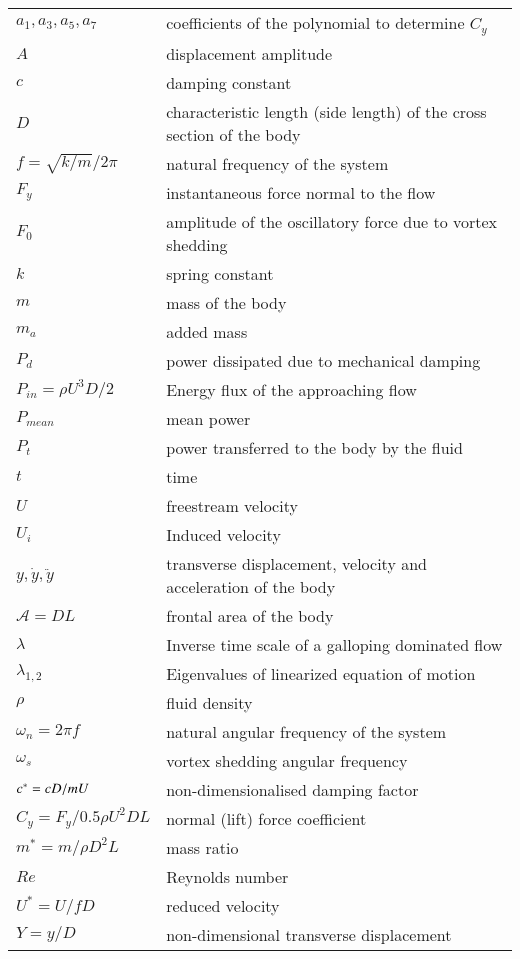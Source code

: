 \begin{tabular}{ll}
$a_1,a_3,a_5,a_7$ & coefficients of the polynomial to determine $C_y$ \\ 
$A$ & displacement amplitude\\
$c$ & damping constant \\
$D$ & characteristic length (side length) of the cross section of the body \\
$f=\sqrt{k/m}/2\pi$ & natural frequency of the system \\
$F_y$ & instantaneous force normal to the flow \\ 
$F_0$& amplitude of the oscillatory force due to vortex shedding \\
$k$ & spring constant \\
$m$ & mass of the body \\
$m_a$ & added mass \\
$P_d$ & power dissipated due to mechanical damping  \\
$P_{in}=\rho U^3D/2$ & Energy flux of the approaching flow \\
$P_{mean}$ & mean power \\
$P_t$   & power transferred to the body by the fluid \\
$t$ & time \\
$U$ & freestream velocity \\
$U_i$ & Induced velocity \\
$y,\dot{y},\ddot{y}$ & transverse displacement, velocity and acceleration of the body \\
$\mathcal{A}=DL$ & frontal area of the body\\ 
$\lambda$ & Inverse time scale of a galloping dominated flow \\
$\lambda_{1,2}$ & Eigenvalues of linearized equation of motion \\
$\rho$ & fluid density  \\
$\omega_n= 2 \pi f$ & natural angular frequency of the system  \\
$\omega_s$ & vortex shedding angular frequency \\
$c^{*}=cD/mU$ & non-dimensionalised damping factor \\
$C_y=F_y/0.5\rho U^2DL$ & normal (lift) force coefficient \\
$m^*=m/\rho D^2L$ & mass ratio \\
$Re$ & Reynolds number  \\
$U^*=U/fD$ & reduced velocity  \\
$Y=y/D$ & non-dimensional transverse displacement \\

\end{tabular}
